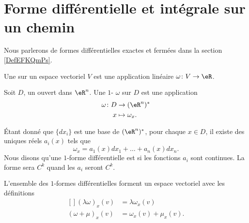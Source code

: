 
\section{Forme différentielle et intégrale sur un chemin}
\label{SecFormDiffRappel}

Nous parlerons de formes différentielles exactes et fermées dans la section \ref{DefEFKQmPs}.

Une  sur un espace vectoriel $V$ est une application linéaire $\omega\colon V\to \eR$.

\begin{definition}
	Soit $D$, un ouvert dans $\eR^n$. Une $1$- $\omega$ sur $D$ est une application
	\begin{equation}
		\begin{aligned}
				\omega\colon D&\to (\eR^n)^* \\
				x&\mapsto \omega_x. 
			\end{aligned}
		\end{equation}
\end{definition}
Étant donné que $\{ dx_i \}$ est une base de $(\eR^n)^*$, pour chaque $x\in D$, il existe des uniques réels $a_i(x)$ tels que
\begin{equation}
	\omega_x=a_1(x)dx_1+\ldots+a_n(x)dx_n.
\end{equation}
Nous disons qu'une $1$-forme différentielle est  si les fonctions $a_i$ sont continues. La forme sera $C^k$ quand les $a_i$ seront $C^k$.

\begin{remark}
	L'ensemble des $1$-formes différentielles forment un espace vectoriel avec les définitions
	\begin{equation}
		\begin{aligned}[]
			(\lambda\omega)_x(v)&=\lambda\omega_x(v)\\
			(\omega+\mu)_x(v)&=\omega_x(v)+\mu_x(v).
		\end{aligned}
	\end{equation}
\end{remark}


